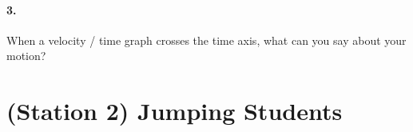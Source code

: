     \begin{mdframed}
        
    \end{mdframed}
    
    \paragraph*{3.} When a velocity / time graph crosses the time axis, what can you say about your motion?

    \begin{mdframed}
        
    \end{mdframed}

    \pagebreak

    \section*{(Station 2) Jumping Students}


